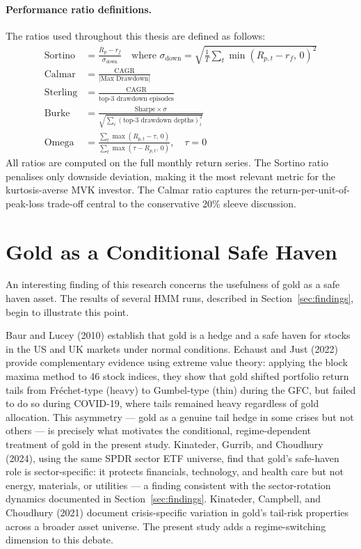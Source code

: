 \documentclass[12pt, a4paper]{article}
\begin{document}
\paragraph*{Performance ratio definitions.}
The ratios used throughout this thesis are defined as follows:
\begin{align*}
  \text{Sortino}  &= \frac{\overline{R}_p - r_f}{\sigma_{\text{down}}}
                   \quad\text{where } \sigma_{\text{down}} = \sqrt{\tfrac{1}{T}\textstyle\sum_t \min(R_{p,t}-r_f,\,0)^2} \\[4pt]
  \text{Calmar}   &= \frac{\text{CAGR}}{|\text{Max Drawdown}|} \\[4pt]
  \text{Sterling} &= \frac{\text{CAGR}}{\overline{\text{top-3 drawdown episodes}}} \\[4pt]
  \text{Burke}    &= \frac{\text{Sharpe} \times \sigma}
                          {\sqrt{\sum_i (\text{top-3 drawdown depths})_i^2}} \\[4pt]
  \text{Omega}    &= \frac{\sum_t \max(R_{p,t} - \tau,\,0)}
                          {\sum_t \max(\tau - R_{p,t},\,0)}, \quad \tau = 0
\end{align*}
All ratios are computed on the full monthly return series. The Sortino ratio penalises only
downside deviation, making it the most relevant metric for the kurtosis-averse MVK investor.
The Calmar ratio captures the return-per-unit-of-peak-loss trade-off central to the
conservative 20\% sleeve discussion.

\clearpage
\section{Gold as a Conditional Safe Haven}
\label{sec:gold}

An interesting finding of this research concerns the usefulness of gold as a safe haven
asset. The results of several HMM runs, described in Section~\ref{sec:findings}, begin to
illustrate this point.

Baur and Lucey (2010) establish that gold is a hedge and a safe haven for stocks in the US
and UK markets under normal conditions. Echaust and Just (2022) provide complementary
evidence using extreme value theory: applying the block maxima method to 46 stock indices,
they show that gold shifted portfolio return tails from Fr\'echet-type (heavy) to Gumbel-type
(thin) during the GFC, but failed to do so during COVID-19, where tails remained heavy
regardless of gold allocation. This asymmetry --- gold as a genuine tail hedge in some crises
but not others --- is precisely what motivates the conditional, regime-dependent treatment
of gold in the present study. Kinateder, Gurrib, and Choudhury (2024), using the same SPDR sector ETF universe,
find that gold's safe-haven role is sector-specific: it protects financials, technology,
and health care but not energy, materials, or utilities --- a finding consistent with the
sector-rotation dynamics documented in Section~\ref{sec:findings}. Kinateder, Campbell,
and Choudhury (2021) document crisis-specific variation in gold's tail-risk properties
across a broader asset universe. The present study adds a regime-switching dimension to
this debate.
\end{document}

